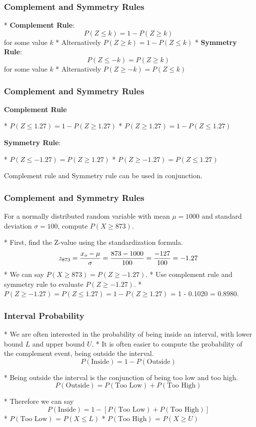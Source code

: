 \frametitle{Complement and Symmetry Rules}

*  \textbf{Complement Rule}: \[ P(Z \leq k) = 1-P(Z \geq k) \] for some value $k$
*  Alternatively $ P(Z \geq k) = 1-P(Z \leq k) $
*  \textbf{Symmetry Rule}: \[ P(Z \leq -k) = P(Z \geq k) \] for some value $k$
*  Alternatively $ P(Z \geq -k) = P(Z \leq k) $




\frametitle{Complement and Symmetry Rules}
\textbf{Complement Rule}


*  $P(Z \leq 1.27) = 1-P(Z \geq 1.27) $
*  $ P(Z \geq 1.27) = 1-P(Z \leq 1.27) $



\textbf{Symmetry Rule}:

*  $ P(Z \leq -1.27) = P(Z \geq 1.27) $
*  $ P(Z \geq -1.27) = P(Z \leq 1.27) $


Complement rule and Symmetry rule can be used in conjunction.






\frametitle{Complement and Symmetry Rules}

For a normally distributed random variable with mean $\mu = 1000$ and standard deviation $\sigma = 100$, compute $P(X \geq 873)$.

 *  First, find the Z-value using the standardization formula.
\[
z_{873} = {x_o - \mu \over \sigma} = {873 - 1000 \over 100} = {-127 \over 100} = -1.27
\]
*  We can say $P(X \geq 873) = P(Z \geq -1.27)$.
*  Use complement rule and symmetry rule to evaluate  $P(Z \geq -1.27)$.
*  $ P(Z \geq -1.27) = P(Z \leq 1.27) = 1 - P(Z \geq 1.27) $  = 1 - 0.1020 = \alert{0.8980}.





\frametitle{Interval Probability}

*  We are often interested in the probability of being inside an interval, with lower bound $L$ and upper bound $U$.
*  It is often easier to compute the probability of the complement event, being outside the interval.
\[ P( \mbox{Inside} ) = 1 - P( \mbox{Outside} )  \]

*  Being outside the interval is the conjunction of being too low and too high.
\[ P( \mbox{Outside} ) = P( \mbox{Too Low} ) +  P( \mbox{Too High} ) \]

*  Therefore we can say
\[ P( \mbox{Inside} ) = 1- [P( \mbox{Too Low} ) +  P( \mbox{Too High} )] \]
*  $P( \mbox{Too Low} )$ = $P( X \leq L)$
*  $P( \mbox{Too High} )$ = $P( X \geq U)$







